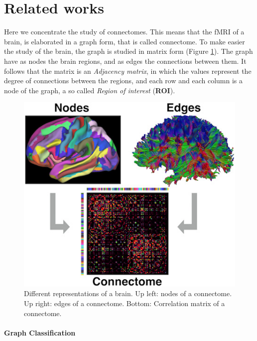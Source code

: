 \section{Related works}

Here we concentrate the study of connectomes. This means that the fMRI of a brain, is elaborated in a graph form, that is called connectome. To make easier the study of the brain, the graph is studied in matrix form (Figure \ref{fig:diagram4}). The graph have as nodes the brain regions, and as edges the connections between them. It follows that the matrix is an \emph{Adjacency matrix}, in which the values represent the degree of connections between the regions, and each row and each column is a node of the graph, a so called \emph{Region of interest} (\textbf{ROI}).
\vspace{0.5cm}

\begin{figure}[htbp]
	\centering
	\includegraphics[scale=0.8]{Immagini/nbm3752-toc-0001-m.jpg}
	\caption{Different representations of a brain. Up left: nodes of a connectome. Up right: edges of a connectome. Bottom: Correlation matrix of a connectome.}
	\label{fig:diagram4}
\end{figure}

\paragraph{Graph Classification}\
\vspace{0.5cm}

